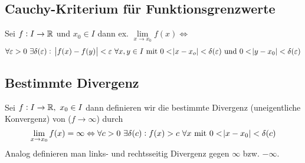 \subsection{Cauchy-Kriterium für Funktionsgrenzwerte}
Sei $f: I \rightarrow \mathbb{R}$ und $x_0 \in I$ dann ex.
$\lim\limits_{x \rightarrow x_0} f(x) \Leftrightarrow$
\begin{equation*}
    \forall \varepsilon > 0\ \exists \delta(\varepsilon):\
    \abs{f(x) - f(y)}<\varepsilon\ \forall x,y \in I \text{ mit }
    0 < \abs{x-x_o} < \delta(\varepsilon) \text{ und }
    0 < \abs{y-x_0} < \delta(\varepsilon)
\end{equation*}

\subsection{Bestimmte Divergenz}
Sei $f: I \rightarrow \mathbb{R} ,\ x_0 \in I$ dann definieren wir die bestimmte
Divergenz (uneigentliche Konvergenz) von ($f \rightarrow \infty$) durch
\begin{equation*}
    \lim_{x \rightarrow x_0} f(x) = \infty \Leftrightarrow
    \forall c>0\ \exists \delta(c): f(x) > c\ \forall x \text{ mit }
    0 < \abs{x - x_0} < \delta(c)
\end{equation*}
Analog definieren man links- und rechtsseitig Divergenz gegen $\infty$ bzw.
$-\infty$.


